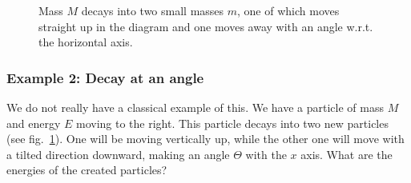 \documentclass[12pt]{article}
\begin{document}
\begin{figure}
\begin{tikzpicture}[x=0.75pt,y=0.75pt,yscale=-1,xscale=1]
\end{tikzpicture}
\caption{Mass $M$ decays into two small masses $m$, one of which moves straight up in the diagram and one moves away with an angle w.r.t. the horizontal axis.}\label{fig:decay}
\end{figure}


\subsubsection*{Example 2: Decay at an angle}
We do not really have a classical example of this.  We have a particle of mass $M$ and energy $E$ moving to the right. This particle decays into two new particles (see fig.~\ref{fig:decay}). One will be moving vertically up, while the other one will move with a tilted direction downward, making an angle $\Theta$ with the $x$ axis. What are the energies of the created particles? 
\end{document}
